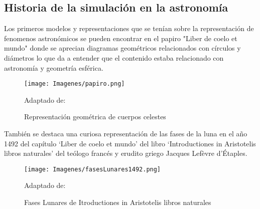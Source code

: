 \subsection*{Historia de la simulación en la astronomía}

Los primeros modelos y representaciones que se tenían sobre la representación 
de fenomenos astronómicos se pueden encontrar en el papiro "Liber de coelo et mundo"
donde se aprecian diagramas geométricos relacionados con círculos y diámetros lo que da a entender
que el contenido estaba relacionado con astronomía y geometría esférica.

\begin{figure}[H]
    \texttt{[image: Imagenes/papiro.png]}
    \centering
    \caption{Representación geométrica de cuerpos celestes}{ Adaptado de: \cite{decaelo}}
\end{figure}

También se destaca una curiosa representación de las fases de la luna en el año 1492 del capítulo `Liber de coelo et mundo' del libro `Introductiones in Aristotelis libros naturales' del teólogo francés y erudito griego Jacques Lefèvre d'Étaples.

\begin{figure}[H]
    \texttt{[image: Imagenes/fasesLunares1492.png]}
    \centering
    \caption{Fases Lunares de Itroductiones in Aristotelis libros naturales}{ Adaptado de: \cite{lunarspine}}
\end{figure}
